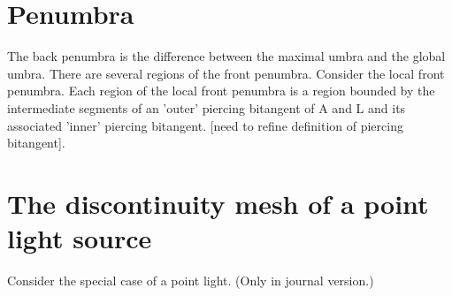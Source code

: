 \documentclass[9pt,twocolumn]{article}
\begin{document}




\clearpage

\clearpage

\section{Penumbra}

The back penumbra is the difference between the maximal umbra
and the global umbra.
There are several regions of the front penumbra.
Consider the local front penumbra.
Each region of the local front penumbra is a region bounded by the intermediate segments
of an 'outer' piercing bitangent of A and L and its associated 'inner' piercing bitangent.
[need to refine definition of piercing bitangent].

\clearpage

\section{The discontinuity mesh of a point light source}

Consider the special case of a point light.
(Only in journal version.)
\end{document}
